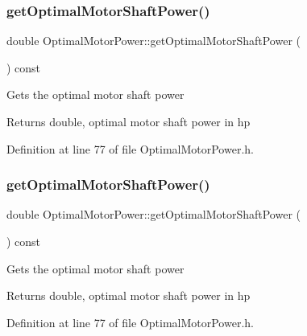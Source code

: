 \subsubsection{\texorpdfstring{get\+Optimal\+Motor\+Shaft\+Power()}{getOptimalMotorShaftPower()}\hspace{0.1cm}{\footnotesize\ttfamily [1/3]}}
{\footnotesize\ttfamily double Optimal\+Motor\+Power\+::get\+Optimal\+Motor\+Shaft\+Power (\begin{DoxyParamCaption}{ }\end{DoxyParamCaption}) const\hspace{0.3cm}{\ttfamily [inline]}}

Gets the optimal motor shaft power \begin{DoxyReturn}{Returns}
double, optimal motor shaft power in hp 
\end{DoxyReturn}


Definition at line 77 of file Optimal\+Motor\+Power.\+h.

\mbox{\label{class_optimal_motor_power_a7d6e976abf406c54637d3b51e098d7c8}} 
\subsubsection{\texorpdfstring{get\+Optimal\+Motor\+Shaft\+Power()}{getOptimalMotorShaftPower()}\hspace{0.1cm}{\footnotesize\ttfamily [2/3]}}
{\footnotesize\ttfamily double Optimal\+Motor\+Power\+::get\+Optimal\+Motor\+Shaft\+Power (\begin{DoxyParamCaption}{ }\end{DoxyParamCaption}) const\hspace{0.3cm}{\ttfamily [inline]}}

Gets the optimal motor shaft power \begin{DoxyReturn}{Returns}
double, optimal motor shaft power in hp 
\end{DoxyReturn}


Definition at line 77 of file Optimal\+Motor\+Power.\+h.

\mbox{\label{class_optimal_motor_power_a7d6e976abf406c54637d3b51e098d7c8}} 

